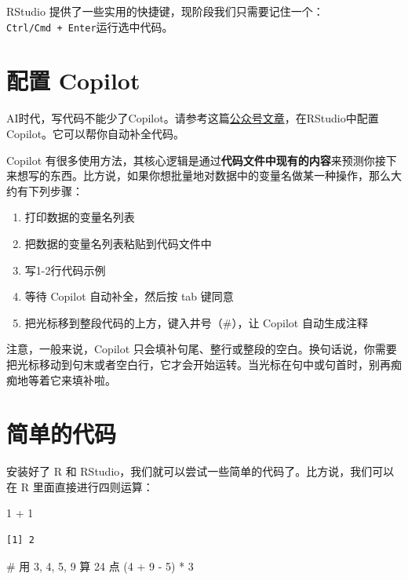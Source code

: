 \documentclass[
  letterpaper,
]{ctexbook}
\newenvironment{Shaded}{\begin{snugshade}}{\end{snugshade}}
\newcommand{\CommentTok}[1]{\textcolor[rgb]{0.37,0.37,0.37}{#1}}
\newcommand{\DecValTok}[1]{\textcolor[rgb]{0.68,0.00,0.00}{#1}}
\newcommand{\NormalTok}[1]{\textcolor[rgb]{0.00,0.23,0.31}{#1}}
\newcommand{\SpecialCharTok}[1]{\textcolor[rgb]{0.37,0.37,0.37}{#1}}
\providecommand{\tightlist}{%
  \setlength{\itemsep}{0pt}\setlength{\parskip}{0pt}}\usepackage{longtable,booktabs,array}
\begin{document}
RStudio
提供了一些实用的快捷键，现阶段我们只需要记住一个：\texttt{Ctrl/Cmd\ +\ Enter}运行选中代码。

\hypertarget{ux914dux7f6e-copilot}{%
\section{配置 Copilot}\label{ux914dux7f6e-copilot}}

AI时代，写代码不能少了Copilot。请参考这篇\href{https://mp.weixin.qq.com/s/YA5LNely0alemNfX0Upoew}{公众号文章}，在RStudio中配置Copilot。它可以帮你自动补全代码。

Copilot
有很多使用方法，其核心逻辑是通过\textbf{代码文件中现有的内容}来预测你接下来想写的东西。比方说，如果你想批量地对数据中的变量名做某一种操作，那么大约有下列步骤：

\begin{enumerate}
\def\labelenumi{\arabic{enumi}.}
\tightlist
\item
  打印数据的变量名列表
\item
  把数据的变量名列表粘贴到代码文件中
\item
  写1-2行代码示例
\item
  等待 Copilot 自动补全，然后按 tab 键同意
\item
  把光标移到整段代码的上方，键入井号（\#），让 Copilot 自动生成注释
\end{enumerate}

注意，一般来说，Copilot
只会填补句尾、整行或整段的空白。换句话说，你需要把光标移动到句末或者空白行，它才会开始运转。当光标在句中或句首时，别再痴痴地等着它来填补啦。

\hypertarget{ux7b80ux5355ux7684ux4ee3ux7801}{%
\section{简单的代码}\label{ux7b80ux5355ux7684ux4ee3ux7801}}

安装好了 R 和
RStudio，我们就可以尝试一些简单的代码了。比方说，我们可以在 R
里面直接进行四则运算：

\begin{Shaded}
\begin{Highlighting}[]
\DecValTok{1} \SpecialCharTok{+} \DecValTok{1}
\end{Highlighting}
\end{Shaded}

\begin{verbatim}
[1] 2
\end{verbatim}

\begin{Shaded}
\begin{Highlighting}[]
\CommentTok{\# 用 3, 4, 5, 9 算 24 点}
\NormalTok{(}\DecValTok{4} \SpecialCharTok{+} \DecValTok{9} \SpecialCharTok{{-}} \DecValTok{5}\NormalTok{) }\SpecialCharTok{*} \DecValTok{3}
\end{Highlighting}
\end{Shaded}
\end{document}
